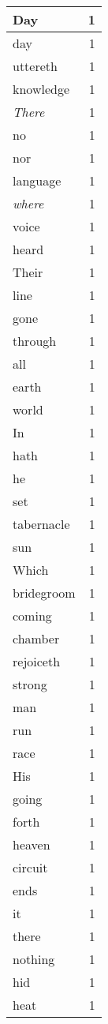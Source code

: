 \begin{center}
\begin{longtable}{l|r}
Day & 1 \\ \hline
day & 1 \\ \hline
uttereth & 1 \\ \hline
knowledge & 1 \\ \hline
\emph{There} & 1 \\ \hline
no & 1 \\ \hline
nor & 1 \\ \hline
language & 1 \\ \hline
\emph{where} & 1 \\ \hline
voice & 1 \\ \hline
heard & 1 \\ \hline
Their & 1 \\ \hline
line & 1 \\ \hline
gone & 1 \\ \hline
through & 1 \\ \hline
all & 1 \\ \hline
earth & 1 \\ \hline
world & 1 \\ \hline
In & 1 \\ \hline
hath & 1 \\ \hline
he & 1 \\ \hline
set & 1 \\ \hline
tabernacle & 1 \\ \hline
sun & 1 \\ \hline
Which & 1 \\ \hline
bridegroom & 1 \\ \hline
coming & 1 \\ \hline
chamber & 1 \\ \hline
rejoiceth & 1 \\ \hline
strong & 1 \\ \hline
man & 1 \\ \hline
run & 1 \\ \hline
race & 1 \\ \hline
His & 1 \\ \hline
going & 1 \\ \hline
forth & 1 \\ \hline
heaven & 1 \\ \hline
circuit & 1 \\ \hline
ends & 1 \\ \hline
it & 1 \\ \hline
there & 1 \\ \hline
nothing & 1 \\ \hline
hid & 1 \\ \hline
heat & 1 \\ \hline

\end{longtable}
\end{center}
